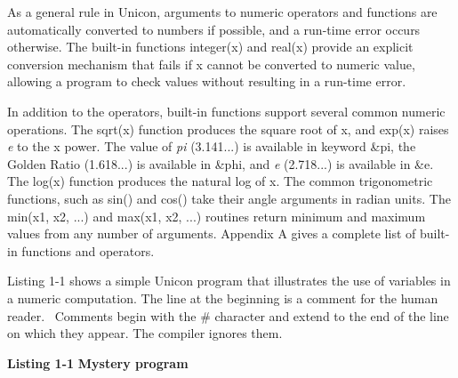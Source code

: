 As a general rule in Unicon, arguments to numeric operators and
functions are automatically converted to numbers if possible, and a run-time error occurs otherwise. The built-in functions
\textsf{integer(x)} and
\textsf{real(x)} provide an explicit conversion
mechanism that fails if \textsf{x} cannot be converted to numeric
value, allowing a program to check values without resulting in a
run-time error.

In addition to the operators, built-in functions support several common
numeric operations. The
\textsf{sqrt(x)} function produces the square root of x,
and \textsf{exp(x)} raises \textit{e} to the \textsf{x}
power. The value of \textit{pi} (3.141...) is
available in keyword \textsf{\&pi}, the Golden Ratio (1.618...) is available in \textsf{\&phi}, and \textit{e} (2.718...) is available in
\textsf{\&e}. The \textsf{log(x)}
function produces the natural log of
\textsf{x}. The common trigonometric
functions, such as \textsf{sin()} and
\textsf{cos()}\textsf{ }take their angle arguments in
radian units. The \textsf{min(x1, x2, ...)}
and \textsf{max(x1, x2, ...)} routines return minimum and
maximum values from any number of arguments. Appendix A gives a
complete list of built-in functions and operators.

Listing 1-1 shows a simple Unicon program that illustrates the use of
variables in a numeric computation. The line at the beginning is a
comment for the human reader. \ Comments begin with the
\textsf{\#} character and extend to the end of the line on which they
appear. The compiler ignores them.

\bigskip

{\sffamily\bfseries Listing 1-1}
{\sffamily\bfseries Mystery program}


